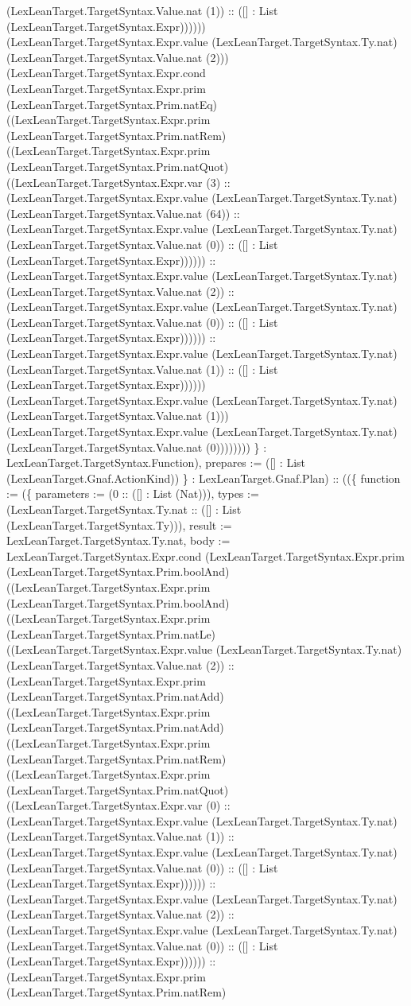 \documentclass[11pt]{article}
\begin{document}
(LexLeanTarget.TargetSyntax.Value.nat (1)) :: ([] : List (LexLeanTarget.TargetSyntax.Expr)))))) (LexLeanTarget.TargetSyntax.Expr.value (LexLeanTarget.TargetSyntax.Ty.nat) (LexLeanTarget.TargetSyntax.Value.nat (2))) (LexLeanTarget.TargetSyntax.Expr.cond (LexLeanTarget.TargetSyntax.Expr.prim (LexLeanTarget.TargetSyntax.Prim.natEq) ((LexLeanTarget.TargetSyntax.Expr.prim (LexLeanTarget.TargetSyntax.Prim.natRem) ((LexLeanTarget.TargetSyntax.Expr.prim (LexLeanTarget.TargetSyntax.Prim.natQuot) ((LexLeanTarget.TargetSyntax.Expr.var (3) :: (LexLeanTarget.TargetSyntax.Expr.value (LexLeanTarget.TargetSyntax.Ty.nat) (LexLeanTarget.TargetSyntax.Value.nat (64)) :: (LexLeanTarget.TargetSyntax.Expr.value (LexLeanTarget.TargetSyntax.Ty.nat) (LexLeanTarget.TargetSyntax.Value.nat (0)) :: ([] : List (LexLeanTarget.TargetSyntax.Expr)))))) :: (LexLeanTarget.TargetSyntax.Expr.value (LexLeanTarget.TargetSyntax.Ty.nat) (LexLeanTarget.TargetSyntax.Value.nat (2)) :: (LexLeanTarget.TargetSyntax.Expr.value (LexLeanTarget.TargetSyntax.Ty.nat) (LexLeanTarget.TargetSyntax.Value.nat (0)) :: ([] : List (LexLeanTarget.TargetSyntax.Expr)))))) :: (LexLeanTarget.TargetSyntax.Expr.value (LexLeanTarget.TargetSyntax.Ty.nat) (LexLeanTarget.TargetSyntax.Value.nat (1)) :: ([] : List (LexLeanTarget.TargetSyntax.Expr)))))) (LexLeanTarget.TargetSyntax.Expr.value (LexLeanTarget.TargetSyntax.Ty.nat) (LexLeanTarget.TargetSyntax.Value.nat (1))) (LexLeanTarget.TargetSyntax.Expr.value (LexLeanTarget.TargetSyntax.Ty.nat) (LexLeanTarget.TargetSyntax.Value.nat (0)))))))) \} : LexLeanTarget.TargetSyntax.Function), prepares := ([] : List (LexLeanTarget.Gnaf.ActionKind)) \} : LexLeanTarget.Gnaf.Plan) :: ((\{ function := (\{ parameters := (0 :: ([] : List (Nat))), types := (LexLeanTarget.TargetSyntax.Ty.nat :: ([] : List (LexLeanTarget.TargetSyntax.Ty))), result := LexLeanTarget.TargetSyntax.Ty.nat, body := LexLeanTarget.TargetSyntax.Expr.cond (LexLeanTarget.TargetSyntax.Expr.prim (LexLeanTarget.TargetSyntax.Prim.boolAnd) ((LexLeanTarget.TargetSyntax.Expr.prim (LexLeanTarget.TargetSyntax.Prim.boolAnd) ((LexLeanTarget.TargetSyntax.Expr.prim (LexLeanTarget.TargetSyntax.Prim.natLe) ((LexLeanTarget.TargetSyntax.Expr.value (LexLeanTarget.TargetSyntax.Ty.nat) (LexLeanTarget.TargetSyntax.Value.nat (2)) :: (LexLeanTarget.TargetSyntax.Expr.prim (LexLeanTarget.TargetSyntax.Prim.natAdd) ((LexLeanTarget.TargetSyntax.Expr.prim (LexLeanTarget.TargetSyntax.Prim.natAdd) ((LexLeanTarget.TargetSyntax.Expr.prim (LexLeanTarget.TargetSyntax.Prim.natRem) ((LexLeanTarget.TargetSyntax.Expr.prim (LexLeanTarget.TargetSyntax.Prim.natQuot) ((LexLeanTarget.TargetSyntax.Expr.var (0) :: (LexLeanTarget.TargetSyntax.Expr.value (LexLeanTarget.TargetSyntax.Ty.nat) (LexLeanTarget.TargetSyntax.Value.nat (1)) :: (LexLeanTarget.TargetSyntax.Expr.value (LexLeanTarget.TargetSyntax.Ty.nat) (LexLeanTarget.TargetSyntax.Value.nat (0)) :: ([] : List (LexLeanTarget.TargetSyntax.Expr)))))) :: (LexLeanTarget.TargetSyntax.Expr.value (LexLeanTarget.TargetSyntax.Ty.nat) (LexLeanTarget.TargetSyntax.Value.nat (2)) :: (LexLeanTarget.TargetSyntax.Expr.value (LexLeanTarget.TargetSyntax.Ty.nat) (LexLeanTarget.TargetSyntax.Value.nat (0)) :: ([] : List (LexLeanTarget.TargetSyntax.Expr)))))) :: (LexLeanTarget.TargetSyntax.Expr.prim (LexLeanTarget.TargetSyntax.Prim.natRem) 
\end{document}
